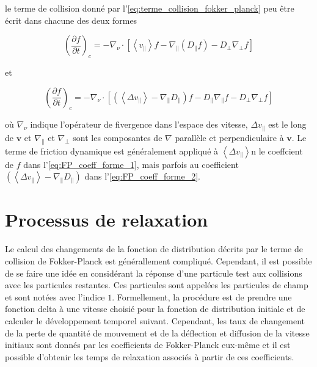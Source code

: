 \documentclass[main.tex]{subfiles}
\begin{document}
\noindent le terme de collision donné par l'\autoref{eq:terme_collision_fokker_planck} peu être écrit dans chacune des deux formes

\begin{equation}
	\left( \frac{\partial f}{\partial t} \right)_c = - \nabla_\nu \cdot \left[ \left\langle v_\parallel \right\rangle	 f - \nabla_\parallel \left( D_\parallel f \right) - D_\perp \nabla_\perp f \right]
	\label{eq:FP_coeff_forme_1}
\end{equation}

\noindent et

\begin{equation}
	\left( \frac{\partial f}{\partial t} \right)_c = - \nabla_\nu \cdot \left[ \left( \left\langle \Delta v_\parallel \right\rangle - \nabla_\parallel D_\parallel \right) f - D_\parallel \nabla_\parallel f - D_\perp \nabla_\perp f \right]
	\label{eq:FP_coeff_forme_2}
\end{equation}

\noindent où \( \nabla_\nu \) indique l'opérateur de fivergence dans l'espace des vitesse, \( \Delta v_\parallel \) est le long de \( \bm{v} \) et \( \nabla_\parallel \) et \( \nabla_\perp \) sont les composantes de \( \nabla \) parallèle et perpendiculaire à \( \bm{v} \).
Le terme de friction dynamique est généralement appliqué à \( \left\langle \Delta v_\parallel \right\rangle \)n le coeffcient de \( f \) dans l'\autoref{eq:FP_coeff_forme_1}, mais parfois au coefficient \( \left( \left\langle \Delta v_\parallel \right\rangle - \nabla_\parallel D_\parallel \right) \) dans l'\autoref{eq:FP_coeff_forme_2}.

\FloatBarrier
\section{Processus de relaxation}
\label{sec:processus_relaxation}

Le calcul des changements de la fonction de distribution décrits par le terme de collision de Fokker-Planck est générallement compliqué.
Cependant, il est possible de se faire une idée en considérant la réponse d'une particule test aux collisions avec les particules restantes.
Ces particules sont appelées les particules de champ et sont notées avec l'indice \( 1 \).
Formellement, la procédure est de prendre une fonction delta à une vitesse choisié pour la fonction de distribution initiale et de calculer le développement temporel suivant.
Cependant, les taux de changement de la perte de quantité de mouvement et de la déflection et diffusion de la vitesse initiaux sont donnés par les coefficients de Fokker-Planck eux-même et il est possible d'obtenir les temps de relaxation associés à partir de ces coefficients.
\end{document}
